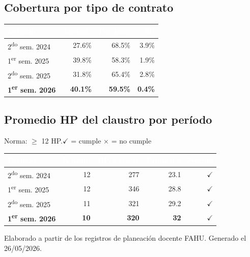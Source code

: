 \documentclass[11pt, a4paper]{article}
\begin{document}
\subsection{Cobertura por tipo de contrato}

\begin{tabular}{lrrr}
\toprule
\rowcolor{usachDark} \textbf{\textcolor{white}{Periodo}} & \textbf{\textcolor{white}{Jornada}} & \textbf{\textcolor{white}{Por hora}} & \textbf{\textcolor{white}{SP}} \\
\midrule
2\textsuperscript{do} sem. 2024 & 27.6\% & 68.5\% & 3.9\% \\
\rowcolor{rowEven}1\textsuperscript{er} sem. 2025 & 39.8\% & 58.3\% & 1.9\% \\
2\textsuperscript{do} sem. 2025 & 31.8\% & 65.4\% & 2.8\% \\
\rowcolor{rowHighlight}\textbf{1\textsuperscript{er} sem. 2026} & \textbf{40.1\%} & \textbf{59.5\%} & \textbf{0.4\%} \\
\bottomrule
\end{tabular}

\subsection{Promedio HP del claustro por período}

Norma: $\geq$ 12 HP.\quad$\checkmark$ = cumple \quad $\times$ = no cumple

\begin{tabular}{lrrrr}
\toprule
\rowcolor{usachDark} \textbf{\textcolor{white}{Periodo}} & \textbf{\textcolor{white}{N acad.}} & \textbf{\textcolor{white}{HP jornada}} & \textbf{\textcolor{white}{Promedio}} & \textbf{\textcolor{white}{Norma}} \\
\midrule
2\textsuperscript{do} sem. 2024 & 12 & 277 & 23.1 & $\checkmark$ \\
\rowcolor{rowEven}1\textsuperscript{er} sem. 2025 & 12 & 346 & 28.8 & $\checkmark$ \\
2\textsuperscript{do} sem. 2025 & 11 & 321 & 29.2 & $\checkmark$ \\
\rowcolor{rowHighlight}\textbf{1\textsuperscript{er} sem. 2026} & \textbf{10} & \textbf{320} & \textbf{32} & \textbf{$\checkmark$} \\
\bottomrule
\end{tabular}

\vfill
{\footnotesize\color{gray} Elaborado a partir de los registros de planeación docente FAHU. Generado el 26/05/2026.}
\end{document}
